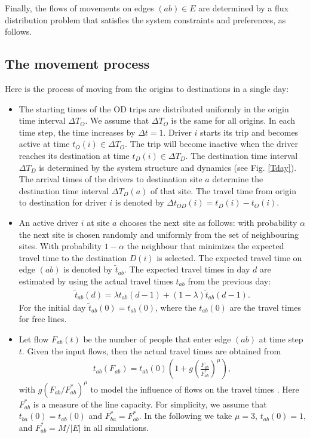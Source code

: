 \documentclass[aps,preprint]{revtex4-1}
\begin{document}
Finally, the flows of movements on edges $(ab)\in E$ are determined by a flux distribution problem that satisfies the system constraints and preferences, as follows. 
 

\subsection{The movement process}\label{S11}
Here is the process of moving from the origins to destinations in a single day:

\begin{itemize}

\item The starting times of the OD trips are distributed uniformly in the origin time interval $\Delta T_O$. We assume that $\Delta T_O$ is the same for all origins. In each time step, the time increases by $\Delta t=1$. Driver $i$ starts its trip and becomes active at time $t_O(i) \in \Delta T_O$. The trip will become inactive when the driver reaches its destination at time $t_D(i) \in \Delta T_D$. The destination time interval $\Delta T_D$ is determined by the system structure and dynamics (see Fig. \ref{Tday}). 
The arrival times of the drivers to destination site $a$ determine the destination time interval $\Delta T_D(a)$ of that site. 
The travel time from origin to destination for driver $i$ is denoted by $\Delta t_{OD}(i)=t_D(i)-t_O(i)$. 

\item An active driver $i$ at site $a$ chooses the next site as follows: with probability $\alpha$ the next site is chosen randomly and uniformly from the set of neighbouring sites. With probability $1-\alpha$ the neighbour that minimizes the expected travel time to the destination $D(i)$ is selected. The expected travel time on edge $(ab)$ is denoted by $\tilde{t}_{ab}$. The expected travel times in day $d$ are estimated by using the actual travel times $t_{ab}$ from the previous day:
\begin{align}\label{tab0}
\tilde{t}_{ab}(d)=\lambda t_{ab}(d-1)+(1-\lambda) \tilde{t}_{ab}(d-1).
\end{align}
For the initial day $\tilde{t}_{ab}(0)=t_{ab}(0)$, where the $t_{ab}(0)$ are the travel times for free lines. 

\item Let flow $F_{ab}(t)$ be the number of people that enter edge $(ab)$ at time step $t$. Given the input flows, then the actual travel times are obtained from 
\begin{align}\label{tab}
t_{ab}(F_{ab})=t_{ab}(0)\left(1+g(\frac{F_{ab}}{F_{ab}^*})^{\mu}\right),
\end{align}
with $g (F_{ab}/F_{ab}^*)^{\mu}$ to model the influence of flows on the travel times \cite{BPR-1964,lc-trans-1976,lc-trans-2011}. Here $F_{ab}^*$ is a measure of the line capacity. For simplicity, we assume that $t_{ba}(0)=t_{ab}(0)$ and $F_{ba}^*= F_{ab}^*$.
In the following we take $\mu=3$, $t_{ab}(0)=1$, and $F_{ab}^*=M/|E|$ in all simulations.

\end{itemize}
\end{document}
